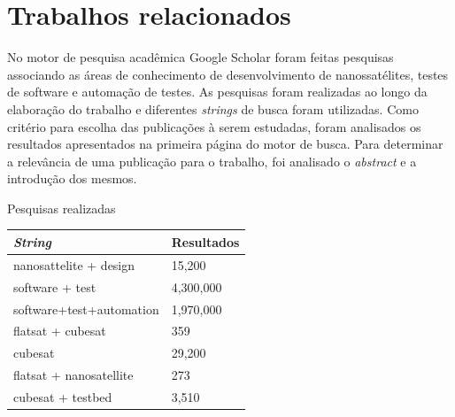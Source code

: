 \chapter{Trabalhos relacionados}

\label{chapter:relacionados}

No motor de pesquisa acadêmica Google Scholar foram feitas pesquisas associando as áreas de conhecimento de desenvolvimento de nanossatélites, testes de software e automação de testes. As pesquisas foram realizadas ao longo da elaboração do trabalho e diferentes \textit{strings} de busca foram utilizadas. Como critério para escolha das publicações à serem estudadas, foram analisados os resultados apresentados na primeira página do motor de busca. Para determinar a relevância de uma publicação para o trabalho, foi analisado o \textit{abstract} e a introdução dos mesmos.


\begin{quadro}[]
\caption{Pesquisas realizadas}
\begin{tabular}{|l|l|}
\hline
\textit{String}          & Resultados \\ \hline
nanosattelite + design   & 15,200     \\
software + test          & 4,300,000  \\
software+test+automation & 1,970,000  \\
flatsat + cubesat        & 359        \\
cubesat                  & 29,200     \\
flatsat + nanosatellite  & 273        \\
cubesat + testbed        & 3,510      \\ \hline
\end{tabular}
 \label{tab:pesquisas}
\end{quadro}


